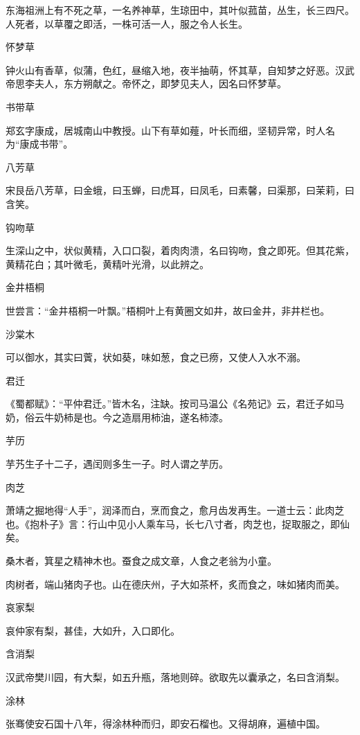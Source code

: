 \documentclass[a4paper,12pt,UTF8,twoside]{ctexbook}
\begin{document}
    东海祖洲上有不死之草，一名养神草，生琼田中，其叶似菰苗，丛生，长三四尺。人死者，以草覆之即活，一株可活一人，服之令人长生。
    
    怀梦草
    
    钟火山有香草，似蒲，色红，昼缩入地，夜半抽萌，怀其草，自知梦之好恶。汉武帝思李夫人，东方朔献之。帝怀之，即梦见夫人，因名曰怀梦草。
    
    书带草
    
    郑玄字康成，居城南山中教授。山下有草如薤，叶长而细，坚韧异常，时人名为“康成书带”。
    
    八芳草
    
    宋艮岳八芳草，曰金蛾，曰玉蝉，曰虎耳，曰凤毛，曰素馨，曰渠那，曰茉莉，曰含笑。
    
    钩吻草
    
    生深山之中，状似黄精，入口口裂，着肉肉溃，名曰钩吻，食之即死。但其花紫，黄精花白；其叶微毛，黄精叶光滑，以此辨之。
    
    金井梧桐
    
    世尝言：“金井梧桐一叶飘。”梧桐叶上有黄圈文如井，故曰金井，非井栏也。
    
    沙棠木
    
    可以御水，其实曰薲，状如葵，味如葱，食之已痨，又使人入水不溺。
    
    君迁
    
    《蜀都赋》：“平仲君迁。”皆木名，注缺。按司马温公《名苑记》云，君迁子如马奶，俗云牛奶柿是也。今之造扇用柿油，遂名柿漆。
    
    芋历
    
    芋艿生子十二子，遇闰则多生一子。时人谓之芋历。
    
    肉芝
    
    萧靖之掘地得“人手”，润泽而白，烹而食之，愈月齿发再生。一道士云：此肉芝也。《抱朴子》言：行山中见小人乘车马，长七八寸者，肉芝也，捉取服之，即仙矣。
    
    桑木者，箕星之精神木也。蚕食之成文章，人食之老翁为小童。
    
    肉树者，端山猪肉子也。山在德庆州，子大如茶杯，炙而食之，味如猪肉而美。
    
    哀家梨
    
    哀仲家有梨，甚佳，大如升，入口即化。
    
    含消梨
    
    汉武帝樊川园，有大梨，如五升瓶，落地则碎。欲取先以囊承之，名曰含消梨。
    
    涂林
    
    张骞使安石国十八年，得涂林种而归，即安石榴也。又得胡麻，遍植中国。
    
\end{document}

